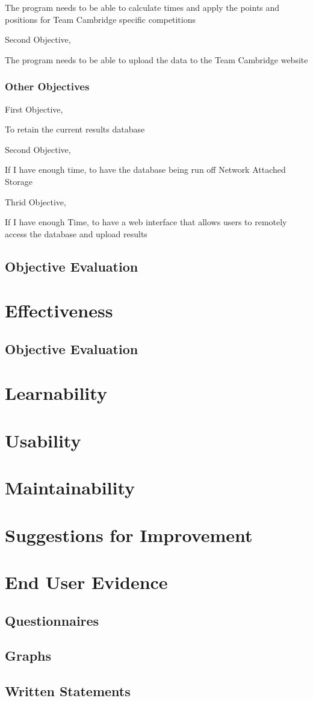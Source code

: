 The program needs to be able to calculate times and apply the points and positions for Team Cambridge specific competitions

Second Objective,

The program needs to be able to upload the data to the Team Cambridge website


\subsubsection{Other Objectives}
First Objective,

To retain the current results database

Second Objective,

If I have enough time, to have the database being run off Network Attached Storage

Thrid Objective,

If I have enough Time, to have a web interface that allows users to remotely access the database and upload results


\subsection{Objective Evaluation}

\section{Effectiveness}

\subsection{Objective Evaluation}

\section{Learnability}

\section{Usability}

\section{Maintainability}

\section{Suggestions for Improvement}

\section{End User Evidence}

\subsection{Questionnaires}

\subsection{Graphs}

\subsection{Written Statements}
